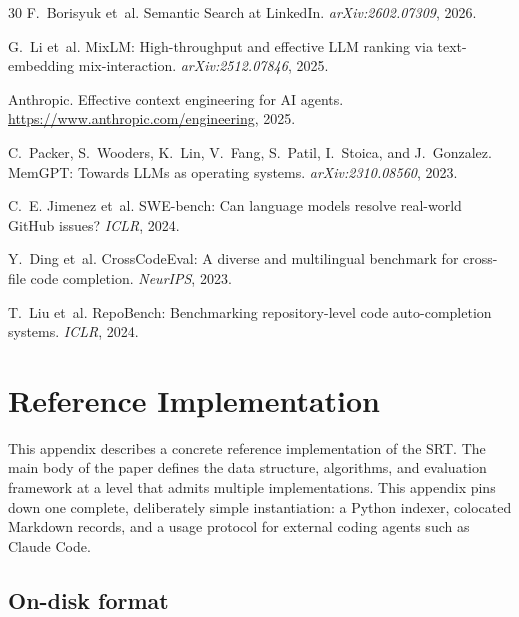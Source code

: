 \documentclass[11pt,a4paper]{article}
\newcommand{\srt}{\textsc{SRT}}
\begin{document}
\begin{thebibliography}{30}
F.~Borisyuk et~al.
\newblock Semantic Search at LinkedIn.
\newblock \emph{arXiv:2602.07309}, 2026.

G.~Li et~al.
\newblock MixLM: High-throughput and effective LLM ranking via text-embedding mix-interaction.
\newblock \emph{arXiv:2512.07846}, 2025.

Anthropic.
\newblock Effective context engineering for AI agents.
\newblock \url{https://www.anthropic.com/engineering}, 2025.

C.~Packer, S.~Wooders, K.~Lin, V.~Fang, S.~Patil, I.~Stoica, and J.~Gonzalez.
\newblock MemGPT: Towards LLMs as operating systems.
\newblock \emph{arXiv:2310.08560}, 2023.

C.~E. Jimenez et~al.
\newblock SWE-bench: Can language models resolve real-world GitHub issues?
\newblock \emph{ICLR}, 2024.

Y.~Ding et~al.
\newblock CrossCodeEval: A diverse and multilingual benchmark for cross-file code completion.
\newblock \emph{NeurIPS}, 2023.

T.~Liu et~al.
\newblock RepoBench: Benchmarking repository-level code auto-completion systems.
\newblock \emph{ICLR}, 2024.

\end{thebibliography}


\appendix
\section{Reference Implementation}\label{app:impl}

This appendix describes a concrete reference implementation of the \srt{}.
The main body of the paper defines the data structure, algorithms, and evaluation framework at a level that admits multiple implementations.
This appendix pins down one complete, deliberately simple instantiation: a Python indexer, colocated Markdown records, and a usage protocol for external coding agents such as Claude Code.

\subsection{On-disk format}\label{app:ondisk}
\end{document}
